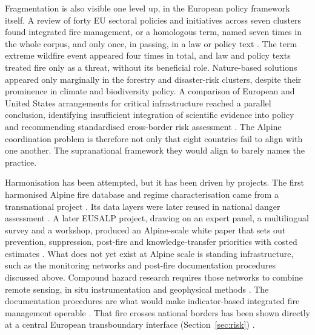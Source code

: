\documentclass[11pt,a4paper]{article}
\begin{document}
Fragmentation is also visible one level up, in the European policy framework itself. A review of forty EU sectoral policies and initiatives across seven clusters found integrated fire management, or a homologous term, named seven times in the whole corpus, and only once, in passing, in a law or policy text \citep{plana_framing_2024}. The term extreme wildfire event appeared four times in total, and law and policy texts treated fire only as a threat, without its beneficial role. Nature-based solutions appeared only marginally in the forestry and disaster-risk clusters, despite their prominence in climate and biodiversity policy. A comparison of European and United States arrangements for critical infrastructure reached a parallel conclusion, identifying insufficient integration of scientific evidence into policy and recommending standardised cross-border risk assessment \citep{kalapodis_towards_2025}. The Alpine coordination problem is therefore not only that eight countries fail to align with one another. The supranational framework they would align to barely names the practice.

Harmonisation has been attempted, but it has been driven by projects. The first harmonised Alpine fire database and regime characterisation came from a transnational project \citep{valese_wildfires_2011}. Its data layers were later reused in national danger assessment \citep{muller_towards_2020}. A later EUSALP project, drawing on an expert panel, a multilingual survey and a workshop, produced an Alpine-scale white paper that sets out prevention, suppression, post-fire and knowledge-transfer priorities with costed estimates \citep{muller_forest_2020}. What does not yet exist at Alpine scale is standing infrastructure, such as the monitoring networks and post-fire documentation procedures discussed above. Compound hazard research requires those networks to combine remote sensing, in situ instrumentation and geophysical methods \citep{baselt_compound_2026}. The documentation procedures are what would make indicator-based integrated fire management operable \citep{melzner_wildfire-induced_2025}. That fire crosses national borders has been shown directly at a central European transboundary interface (Section~\ref{sec:risk}) \citep{avouris_exposure_2025}.
\end{document}
